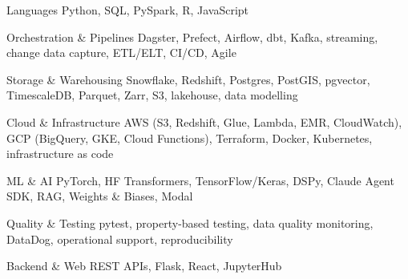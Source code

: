 

\begin{cvskills}

  \cvskill
    {Languages} %
    {Python, SQL, PySpark, R, JavaScript} %

  \cvskill
    {Orchestration \& Pipelines} %
    {Dagster, Prefect, Airflow, dbt, Kafka, streaming, change data capture, ETL/ELT, CI/CD, Agile} %

  \cvskill
    {Storage \& Warehousing} %
    {Snowflake, Redshift, Postgres, PostGIS, pgvector, TimescaleDB, Parquet, Zarr, S3, lakehouse, data modelling} %

  \cvskill
    {Cloud \& Infrastructure} %
    {AWS (S3, Redshift, Glue, Lambda, EMR, CloudWatch), GCP (BigQuery, GKE, Cloud Functions), Terraform, Docker, Kubernetes, infrastructure as code} %

  \cvskill
    {ML \& AI} %
    {PyTorch, HF Transformers, TensorFlow/Keras, DSPy, Claude Agent SDK, RAG, Weights \& Biases, Modal} %

  \cvskill
    {Quality \& Testing} %
    {pytest, property-based testing, data quality monitoring, DataDog, operational support, reproducibility} %

  \cvskill
    {Backend \& Web} %
    {REST APIs, Flask, React, JupyterHub} %

\end{cvskills}
